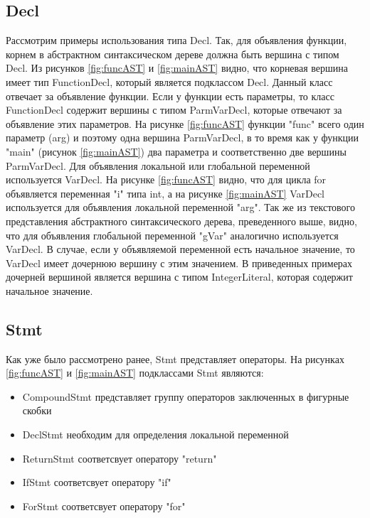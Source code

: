 \subsection*{Decl}
Рассмотрим примеры использования типа Decl. Так, для объявления функции, корнем в абстрактном 
синтаксическом дереве должна быть вершина с типом Decl. Из рисунков \ref{fig:funcAST} и \ref{fig:mainAST} 
видно, что корневая вершина имеет тип FunctionDecl, который является подклассом Decl. Данный класс 
отвечает за объявление функции. Если у функции есть параметры, то класс FunctionDecl содержит 
вершины с типом ParmVarDecl, которые отвечают за объявление этих параметров. На рисунке 
\ref{fig:funcAST} функции "func" всего один параметр (arg) и поэтому одна вершина ParmVarDecl, 
в то время как у функции "main" (рисунок \ref{fig:mainAST}) два параметра и 
соответственно две вершины ParmVarDecl. Для объявления локальной или глобальной переменной 
используется VarDecl. На рисунке \ref{fig:funcAST} видно, что для цикла for объявляется переменная "i" типа int,
а на рисунке \ref{fig:mainAST} VarDecl используется для объявления локальной переменной "arg". Так же из
текстового представления абстрактного синтаксического дерева, преведенного выше, видно, что для 
объявления глобальной переменной "gVar" аналогично используется VarDecl. В случае, если у объявляемой 
переменной есть начальное значение, то VarDecl имеет дочернюю вершину с этим значением. В приведенных
примерах дочерней вершиной является вершина с типом IntegerLiteral, которая содержит начальное значение.

\subsection*{Stmt}
Как уже было рассмотрено ранее, Stmt представляет операторы. На рисунках \ref{fig:funcAST} и \ref{fig:mainAST} 
подклассами Stmt являются:
\begin{itemize}
 \item CompoundStmt представляет группу операторов заключенных в фигурные скобки
 \item DeclStmt необходим для определения локальной переменной
 \item ReturnStmt соответсвует оператору "return"
 \item IfStmt соответсвует оператору "if"
 \item ForStmt соответсвует оператору "for"
\end{itemize}

